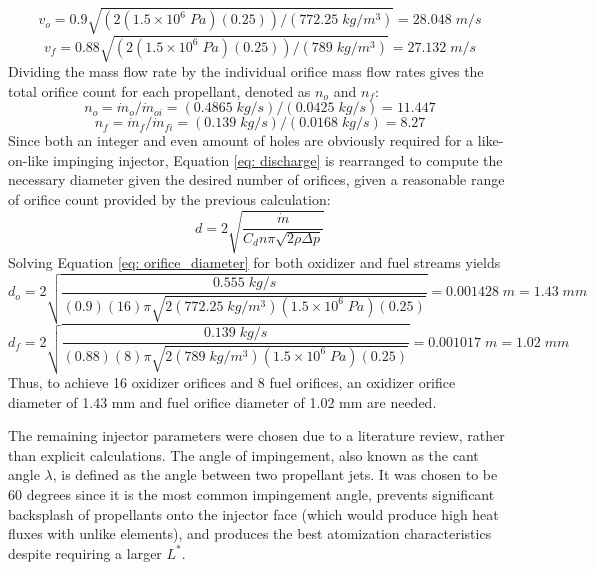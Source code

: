 \documentclass[9pt]{article} %
\numberwithin{equation}{section} %
\begin{document}
\begin{equation*}
    v_{o} = 0.9 \sqrt{(2(1.5\times 10^{6} \; Pa)(0.25))/(772.25 \; kg/m^{3})} = 28.048 \; m/s
\end{equation*}
\begin{equation*}
    v_{f} = 0.88 \sqrt{(2(1.5\times 10^{6} \; Pa)(0.25))/(789 \; kg/m^{3})} = 27.132 \; m/s
\end{equation*}
Dividing the mass flow rate by the individual orifice mass flow rates gives the total orifice count for each propellant, denoted as $n_{o}$ and $n_{f}$:
\begin{equation*}
    n_{o} = \dot{m}_{o}/\dot{m}_{oi} = (0.4865 \; kg/s)/(0.0425 \; kg/s) = 11.447
\end{equation*}
\begin{equation*}
    n_{f} = \dot{m}_{f}/\dot{m}_{fi} = (0.139 \; kg/s)/(0.0168 \; kg/s) = 8.27
\end{equation*}
Since both an integer and even amount of holes are obviously required for a like-on-like impinging injector, Equation \ref{eq: discharge} is rearranged to compute the necessary diameter given the desired number of orifices, given a reasonable range of orifice count provided by the previous calculation:
\begin{equation} \label{eq: orifice_diameter}
d = 2 \sqrt{\frac{\dot{m}}{C_{d} n \pi \sqrt{2 \rho \Delta p}}}
\end{equation}
Solving Equation \ref{eq: orifice_diameter} for both oxidizer and fuel streams yields
\begin{equation*}
d_{o} = 2 \sqrt{\frac{0.555 \; kg/s}{(0.9)(16) \pi \sqrt{2 (772.25 \; kg/m^{3})(1.5 \times 10^{6} \; Pa)(0.25)}}} = 0.001428 \; m = 1.43 \; mm
\end{equation*}
\begin{equation*}
d_{f} = 2 \sqrt{\frac{0.139 \; kg/s}{(0.88)(8) \pi \sqrt{2 (789 \; kg/m^{3})(1.5 \times 10^{6} \; Pa)(0.25)}}} = 0.001017 \; m = 1.02 \; mm
\end{equation*}
Thus, to achieve 16 oxidizer orifices and 8 fuel orifices, an oxidizer orifice diameter of 1.43 mm and fuel orifice diameter of 1.02 mm are needed.

The remaining injector parameters were chosen due to a literature review, rather than explicit calculations. The angle of impingement, also known as the cant angle $\lambda$, is defined as the angle between two propellant jets. It was chosen to be 60 degrees since it is the most common impingement angle, prevents significant backsplash of propellants onto the injector face (which would produce high heat fluxes with unlike elements), and produces the best atomization characteristics despite requiring a larger $L^{*}$.
\end{document}
